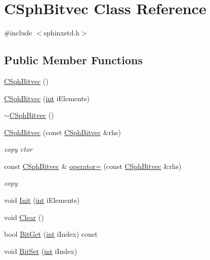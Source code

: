 \hypertarget{classCSphBitvec}{\section{C\-Sph\-Bitvec Class Reference}
\label{classCSphBitvec}
}


{\ttfamily \#include $<$sphinxstd.\-h$>$}

\subsection*{Public Member Functions}
\begin{DoxyCompactItemize}
\item 
\hyperlink{classCSphBitvec_a7661e6085fb0ad4d858c44925cfa2ccc}{C\-Sph\-Bitvec} ()
\item 
\hyperlink{classCSphBitvec_a12dc415a04587c12cb7eff1522eef51f}{C\-Sph\-Bitvec} (\hyperlink{sphinxexpr_8cpp_a4a26e8f9cb8b736e0c4cbf4d16de985e}{int} i\-Elements)
\item 
\hyperlink{classCSphBitvec_adc1b0c2b7b9bd0326812e9433c83b026}{$\sim$\-C\-Sph\-Bitvec} ()
\item 
\hyperlink{classCSphBitvec_af39d1f5f9d3e4478a91d0ca203d9e2b6}{C\-Sph\-Bitvec} (const \hyperlink{classCSphBitvec}{C\-Sph\-Bitvec} \&rhs)
\begin{DoxyCompactList}\small\item\em copy ctor \end{DoxyCompactList}\item 
const \hyperlink{classCSphBitvec}{C\-Sph\-Bitvec} \& \hyperlink{classCSphBitvec_afb7a870fb8974ff94ccb6686efae4b58}{operator=} (const \hyperlink{classCSphBitvec}{C\-Sph\-Bitvec} \&rhs)
\begin{DoxyCompactList}\small\item\em copy \end{DoxyCompactList}\item 
void \hyperlink{classCSphBitvec_a2313b97c1a521344f2b206ebef0acddd}{Init} (\hyperlink{sphinxexpr_8cpp_a4a26e8f9cb8b736e0c4cbf4d16de985e}{int} i\-Elements)
\item 
void \hyperlink{classCSphBitvec_a0bec38a11ce60fccd1dae0f4bb5609af}{Clear} ()
\item 
bool \hyperlink{classCSphBitvec_a2447dc63128444c035980c2035be9902}{Bit\-Get} (\hyperlink{sphinxexpr_8cpp_a4a26e8f9cb8b736e0c4cbf4d16de985e}{int} i\-Index) const 
\item 
void \hyperlink{classCSphBitvec_af823d0dcf37032126f8536703685900e}{Bit\-Set} (\hyperlink{sphinxexpr_8cpp_a4a26e8f9cb8b736e0c4cbf4d16de985e}{int} i\-Index)

\end{DoxyCompactItemize}
